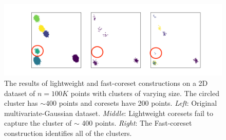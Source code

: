 \begin{figure}
\centering
\hspace*{-0.1cm}
\includegraphics[trim={4cm 0 0 0},clip,width=1.13\linewidth]{images/lightweight_breaks.png}
\caption{
The results of lightweight and fast-coreset constructions on a 2D dataset of $n=100K$ points with clusters of varying size. The circled cluster has $\sim 400$
points and coresets have 200 points.
\emph{Left}: Original multivariate-Gaussian dataset.
\emph{Middle}: Lightweight coresets fail to capture the cluster of $\sim$ 400 points.
\emph{Right}: The Fast-coreset construction identifies all of the clusters.
}
\label{fig:lightweight_breaks}
\end{figure}
